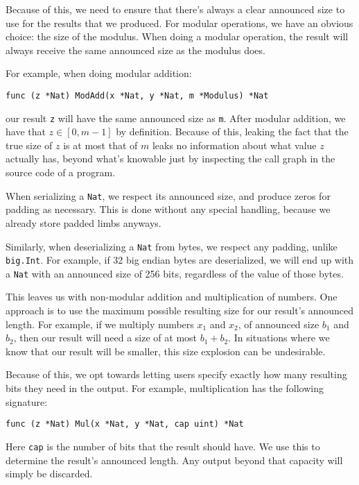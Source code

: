 \documentclass[11pt, a4paper]{article} %
\begin{document}
{Because of this, we need to ensure that there's always a clear
announced size to use for the results that we produced. For modular
operations, we have an obvious choice: the size of the modulus.
When doing a modular operation, the result will always receive
the same announced size as the modulus does.

For example, when doing modular addition:

\begin{verbatim}
func (z *Nat) ModAdd(x *Nat, y *Nat, m *Modulus) *Nat
\end{verbatim}

our result \texttt{z} will have the same announced size as \texttt{m}.
After modular addition, we have that $z \in [0, m - 1]$ by definition.
Because of this, leaking the fact that the true size of $z$
is at most that of $m$ leaks no information about what value $z$
actually has, beyond what's knowable just by inspecting the call
graph in the source code of a program.

When serializing a \texttt{Nat}, we respect its announced size,
and produce zeros for padding as necessary. This is done without
any special handling, because we already store padded limbs anyways.

Similarly, when deserializing a \texttt{Nat} from bytes,
we respect any padding, unlike \texttt{big.Int}. For example,
if 32 big endian bytes are deserialized, we will end up
with a \texttt{Nat} with an announced size of 256 bits, regardless
of the value of those bytes.

This leaves us with non-modular addition and multiplication of numbers.
One approach is to use the maximum possible resulting size for our
result's announced length. For example, if we multiply
numbers $x_1$ and $x_2$, of announced size $b_1$ and $b_2$, then
our result will need a size of at most $b_1 + b_2$.
In situations where we know that our result will be smaller,
this size explosion can be undesirable.

Because of this, we opt towards letting users specify exactly how many
resulting bits they need in the output. For example,
multiplication has the following signature:

\begin{verbatim}
func (z *Nat) Mul(x *Nat, y *Nat, cap uint) *Nat
\end{verbatim}

Here \texttt{cap} is the number of bits that the result should have.
We use this to determine the result's announced length. Any output
beyond that capacity will simply be discarded.

}
\end{document}
